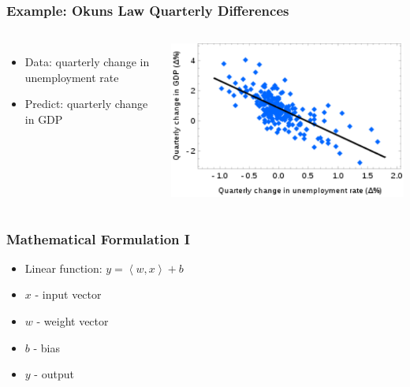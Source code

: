 \begin{frame}
    \frametitle{Example: Okuns Law Quarterly Differences}
    \begin{columns}
            \begin{itemize}
                \item Data: quarterly change in unemployment rate 
                \item Predict: quarterly change in GDP
            \end{itemize}
            \includegraphics[width=1\linewidth]{linreg-pics/lg}\\

    \end{columns}
\end{frame}


\begin{frame}
    \frametitle{Mathematical Formulation I}
            \begin{itemize}
                \item Linear function: $y =  \left< w, x \right> + b$
                \item $x$ - input vector   
                \item $w$ - weight vector
                \item $b$ - bias
                \item $y$ - output 
            \end{itemize}
\end{frame}


